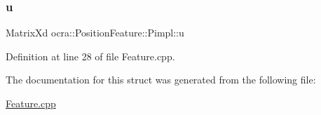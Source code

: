 \subsubsection{\texorpdfstring{u}{u}}
{\footnotesize\ttfamily Matrix\+Xd ocra\+::\+Position\+Feature\+::\+Pimpl\+::u}



Definition at line 28 of file Feature.\+cpp.



The documentation for this struct was generated from the following file\+:\begin{DoxyCompactItemize}
\item 
\hyperlink{Feature_8cpp}{Feature.\+cpp}\end{DoxyCompactItemize}
